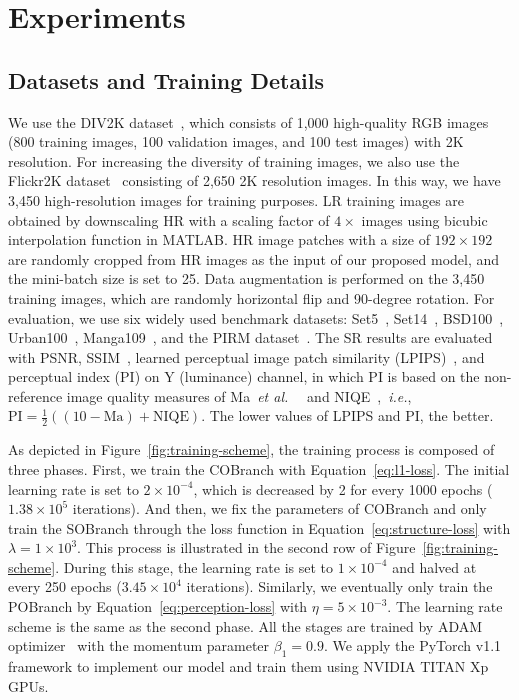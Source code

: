 \documentclass[preprint]{elsarticle}
\newcommand{\etal}{\textit{et al.~}}
\newcommand{\ie}{\textit{i.e.}}
\begin{document}
\section{Experiments}\label{sec:experiments}
\subsection{Datasets and Training Details}
We use the DIV2K dataset~\cite{NTIRE2017}, which consists of 1,000 high-quality RGB images (800 training images, 100 validation images, and 100 test images) with 2K resolution. For increasing the diversity of training images, we also use the Flickr2K dataset~\cite{EDSR} consisting of 2,650 2K resolution images. In this way, we have 3,450 high-resolution images for training purposes. LR training images are obtained by downscaling HR with a scaling factor of $4 \times$ images using bicubic interpolation function in MATLAB. HR image patches with a size of $192 \times 192$ are randomly cropped from HR images as the input of our proposed model, and the mini-batch size is set to 25. Data augmentation is performed on the 3,450 training images, which are randomly horizontal flip and 90-degree rotation. For evaluation, we use six widely used benchmark datasets: Set5~\cite{Set5}, Set14~\cite{Set14}, BSD100~\cite{BSD100}, Urban100~\cite{Urban100}, Manga109~\cite{Manga109}, and the PIRM dataset~\cite{PIRM-SR}. The SR results are evaluated with PSNR, SSIM~\cite{SSIM}, learned perceptual image patch similarity (LPIPS)~\cite{LPIPS}, and perceptual index (PI) on Y (luminance) channel, in which PI is based on the non-reference image quality measures of Ma~\etal~\cite{Ma_Score} and NIQE~\cite{NIQE},~\ie, $\text{PI} = \frac{1}{2}\left( {\left( {10 - \text{Ma}} \right) + \text{NIQE}} \right)$. The lower values of LPIPS and PI, the better.

As depicted in Figure~\ref{fig:training-scheme}, the training process is composed of three phases. First, we train the COBranch with Equation~\ref{eq:l1-loss}. The initial learning rate is set to $2 \times {10^{ - 4}}$, which is decreased by 2 for every 1000 epochs ($1.38 \times {10^5}$ iterations). And then, we fix the parameters of COBranch and only train the SOBranch through the loss function in Equation~\ref{eq:structure-loss} with $\lambda  = 1 \times {10^3}$. This process is illustrated in the second row of Figure~\ref{fig:training-scheme}. During this stage, the learning rate is set to $1 \times {10^{ - 4}}$ and halved at every 250 epochs ($3.45 \times {10^4}$ iterations). Similarly, we eventually only train the POBranch by Equation~\ref{eq:perception-loss} with $\eta  = 5 \times {10^{ - 3}}$. The learning rate scheme is the same as the second phase. All the stages are trained by ADAM optimizer~\cite{Adam} with the momentum parameter ${\beta _1} = 0.9$. We apply the PyTorch v1.1 framework to implement our model and train them using NVIDIA TITAN Xp GPUs.
\end{document}
